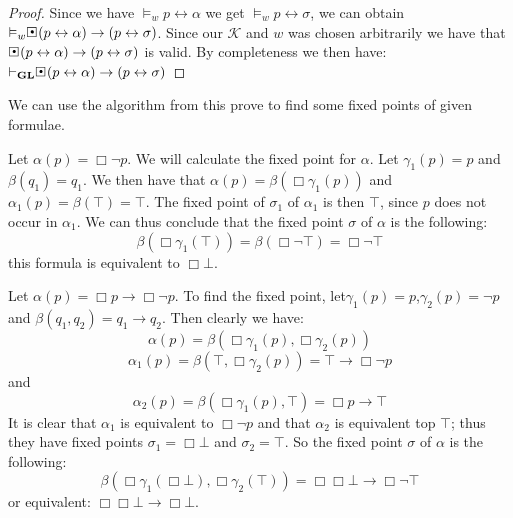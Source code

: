 \documentclass[../main.tex]{subfiles}
\begin{document}
\begin{proof}
	Since we have $\vDash_w p\leftrightarrow\alpha$ we get $\vDash_w
	p\leftrightarrow\sigma$, we can obtain
	$\vDash_w\sBox(p\leftrightarrow\alpha)\rightarrow(p\leftrightarrow\sigma)$.
	Since our $\mathcal{K}$ and $w$ was chosen arbitrarily we have that
	$\sBox(p\leftrightarrow\alpha)\rightarrow(p\leftrightarrow\sigma)$ is
	valid. By completeness we then have:
	$\vdash_\GL\sBox(p\leftrightarrow\alpha)\rightarrow(p\leftrightarrow
	\sigma)$
\end{proof}
We can use the algorithm from this prove to find some fixed points of given
formulae.

\begin{exmp}
	Let $\alpha(p)=\Box \neg p$. We will calculate the fixed point for
	$\alpha$. Let $\gamma_1 (p)=p$ and $\beta(q_1)=q_1$. We then have that
	$\alpha(p)=\beta(\Box\gamma_1(p))$ and $\alpha_1(p)=\beta(\top)=\top$.
	The fixed point of $\sigma_1$ of $\alpha_1$ is then $\top$, since $p$
	does not occur in $\alpha_1$. We can thus conclude that the fixed point
	$\sigma$ of $\alpha$ is the following:
	\[\beta(\Box\gamma_1(\top))=\beta(\Box\neg\top)=\Box\neg\top\]
	this formula is equivalent to $\Box\bot$.
\end{exmp}
\begin{exmp}
	Let $\alpha(p)=\Box p\rightarrow\Box\neg p$. To find the fixed point,
	let$\gamma_1(p)=p$,$\gamma_2(p)=\neg p$ and
	$\beta(q_1,q_2)=q_1\rightarrow q_2$. Then clearly we have:
	\[\alpha(p)=\beta(\Box\gamma_1(p),\Box\gamma_2(p))\]
	\[\alpha_1(p)=\beta(\top,\Box\gamma_2(p))=\top\rightarrow\Box\neg p\]
	and 
	\[\alpha_2(p)=\beta(\Box\gamma_1(p),\top)=\Box p\rightarrow \top\]
	It is clear that $\alpha_1$ is equivalent to $\Box\neg p$ and that
	$\alpha_2$ is equivalent top $\top$; thus they have fixed points
	$\sigma_1=\Box\bot$ and $\sigma_2=\top$. So the fixed point $\sigma$
	of $\alpha$ is the following:
	\[\beta(\Box\gamma_1(\Box\bot),\Box\gamma_2(\top))=\Box\Box\bot\rightarrow\Box\neg\top\]
	or equivalent: $\Box\Box\bot\rightarrow\Box\bot$.
\end{exmp}
\end{document}
